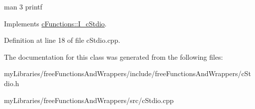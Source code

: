 man 3 printf 

Implements \mbox{\hyperlink{classcFunctions_1_1I__cStdio_a1f0f3e02f8818ec070705d7195f1f517}{c\+Functions\+::\+I\+\_\+c\+Stdio}}.



Definition at line 18 of file c\+Stdio.\+cpp.



The documentation for this class was generated from the following files\+:\begin{DoxyCompactItemize}
\item 
my\+Libraries/free\+Functions\+And\+Wrappers/include/free\+Functions\+And\+Wrappers/c\+Stdio.\+h\item 
my\+Libraries/free\+Functions\+And\+Wrappers/src/c\+Stdio.\+cpp\end{DoxyCompactItemize}
